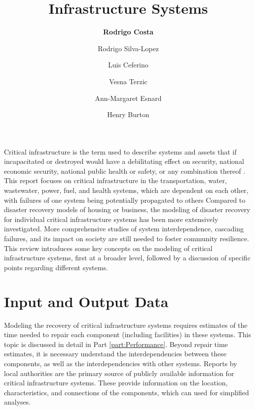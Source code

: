 \title{Infrastructure Systems}
\author{
    \textbf{Rodrigo Costa}
    \and Rodrigo Silva-Lopez 
    \and Luis Ceferino 
    \and{Vesna Terzic}
    \and{Ann-Margaret Esnard}
    \and{Henry Burton}}
\tocauthor{}
%
%
\maketitle
Critical infrastructure is the term used to describe systems and assets that if incapacitated or destroyed would have a debilitating effect on security, national economic security, national public health or safety, or any combination thereof \citep{DHS_CI}. This report focuses on critical infrastructure in the transportation, water, wastewater, power, fuel, and health systems, which are dependent on each other, with failures of one system being potentially propagated to others Compared to disaster recovery models of housing or business, the modeling of disaster recovery for individual critical infrastructure systems has been more extensively investigated.  More comprehensive studies of system interdependence, cascading failures, and its impact on society are still needed to foster community resilience. This review introduces some key concepts on the modeling of critical infrastructure systems, first at a broader level, followed by a discussion of specific points regarding different systems.\ 

\FloatBarrier
\section{Input and Output Data}
Modeling the recovery of critical infrastructure systems requires estimates of the time needed to repair each component (including facilities) in these systems. This topic is discussed in detail in Part \ref{part:Performance}. Beyond repair time estimates, it is necessary understand the interdependencies between these components, as well as the interdependencies with other systems. Reports by local authorities are the primary source of publicly available information for critical infrastructure systems. These provide information on the location, characteristics, and connections of the components, which can used for simplified analyses.

